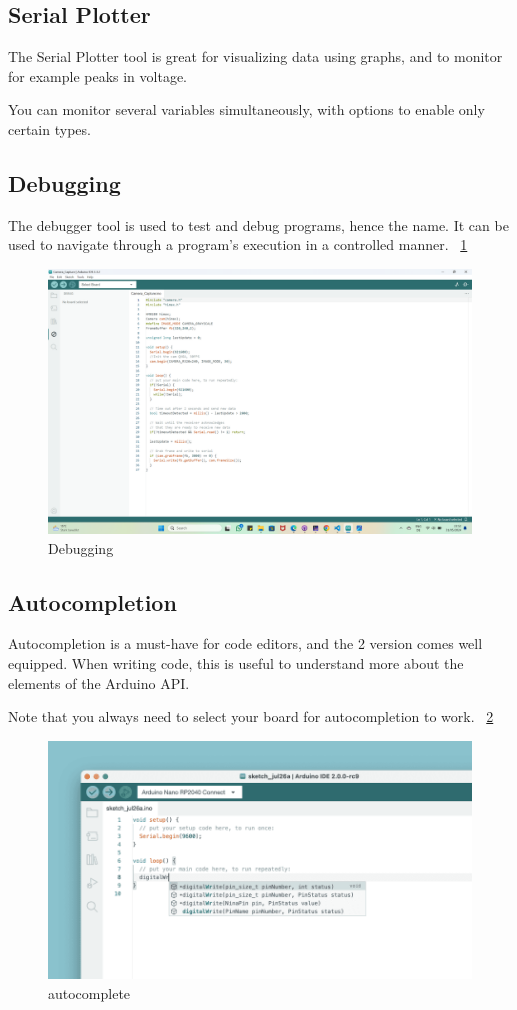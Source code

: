 	\subsection{Serial Plotter}
	The Serial Plotter tool is great for visualizing data using graphs, and to monitor for example peaks in voltage.
	
	You can monitor several variables simultaneously, with options to enable only certain types. 
	
	\subsection{Debugging}
	The debugger tool is used to test and debug programs, hence the name. It can be used to navigate through a program's execution in a controlled manner. ~\ref{Debug}
	
	\begin{figure}
		\begin{center}
			\includegraphics[width=0.7\linewidth]{Images/Arduino/Debug.png}
			\caption{Debugging}
			\label{Debug}
		\end{center}
	\end{figure}
	
	\subsection{Autocompletion}
	Autocompletion is a must-have for code editors, and the 2 version comes well equipped. When writing code, this is useful to understand more about the elements of the Arduino API.
	
	Note that you always need to select your board for autocompletion to work. ~\ref{autocomplete}
	
	\begin{figure}
		\begin{center}
			\includegraphics[width=0.6\linewidth]{Images/Arduino/autocomplete.png}
			\caption{autocomplete}
			\label{autocomplete}
		\end{center}
	\end{figure}
	
